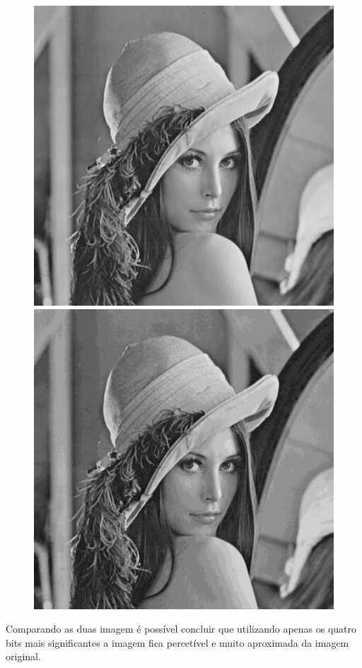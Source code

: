 \documentclass[12pt,a4paper]{article}
\begin{document}
\begin{figure}[h]
\centering
\begin{minipage}{.5\textwidth}
  \centering
  \includegraphics[scale=0.3]{lenaCinzento}
\end{minipage}%
\begin{minipage}{.5\textwidth}
  \centering
  \includegraphics[scale=0.3]{quatrobits}
\end{minipage}
\end{figure}
Comparando as duas imagem é possível concluir que utilizando apenas os quatro bits mais significantes a imagem fica percetível e muito aproximada da imagem original.
\end{document}
